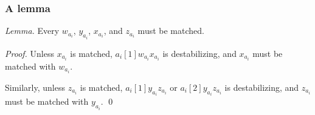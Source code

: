 \documentclass[mathserif,serif]{beamer}
\begin{document}
\begin{frame}
	\frametitle{A lemma}

	\emph{Lemma.}
	Every $w_{a_i}$, $y_{a_i}$, $x_{a_i}$, and $z_{a_i}$ must be matched.

	\emph{Proof.}
	Unless $x_{a_i}$ is matched, $a_i[1]w_{a_i}x_{a_i}$ is destabilizing, and $x_{a_i}$ must be matched with
	$w_{a_i}$.

	Similarly, unless $z_{a_i}$ is matched, $a_i[1]y_{a_i}z_{a_i}$ or $a_i[2]y_{a_i}z_{a_i}$ is destabilizing, and
	$z_{a_i}$ must be matched with $y_{a_i}$.
	\qed
\end{frame}

%
%
%

%
\end{document}

